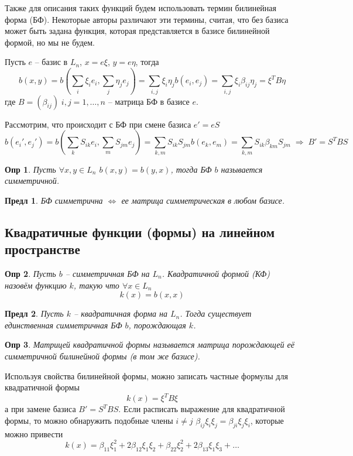 \documentclass[a4paper,12pt]{article}
\newtheorem*{definition}{Опр}
\newtheorem{propos}{Предл}[section]
\begin{document}
Также для описания таких функций будем использовать термин билинейная форма (БФ). Некоторые авторы различают эти термины, считая, что без базиса может быть задана функция, которая представляется в базисе билинейной формой, но мы не будем.

Пусть $e$ -- базис в $L_n$, $x = e\xi$, $y = e\eta$, тогда 
\[
	b(x,y) = b\left( \sum_{i} \xi_i e_i, \sum_{j} \eta_j e_j \right) = \sum_{i,j} \xi_i \eta_j b(e_i, e_j) = \sum_{i,j} \xi_i \beta_{ij} \eta_j  = \xi^T B \eta
\]
где $B = (\beta_{ij}) \; i,j = 1,\ldots, n$ -- матрица БФ в базисе $e$. 

Рассмотрим, что происходит с БФ при смене базиса $e' = eS$
\[
	b(e_i', e_j') = b\left( \sum_{k} S_{ik} e_i, \sum_{m} S_{jm} e_j \right) =  \sum_{k, m} S_{ik} S_{jm} b(e_k, e_m) = \sum_{k, m} S_{ik} \beta_{km} S_{jm} \; \Rightarrow \; B' = S^T B S
\]

\begin{definition}
	Пусть $\forall x,y \in L_n$ $b(x,y) = b(y,x)$, тогда БФ $b$ называется симметричной.
\end{definition}

\begin{propos}
	БФ симметрична $\Leftrightarrow$ ее матрица симметрическая в любом базисе.
\end{propos}

\subsection{Квадратичные функции (формы) на линейном пространстве}

\begin{definition}
	Пусть $b$ -- симметричная БФ на $L_n$. Квадратичной формой (КФ) назовём функцию $k$, такую что $\forall x \in L_n$ 
	\[
		k(x) = b(x,x)
	\]
\end{definition}

\begin{propos}
	Пусть $k$ -- квадратичная форма на $L_n$. Тогда существует единственная симметричная БФ $b$, порождающая $k$.
\end{propos}

\begin{definition}
	Матрицей квадратичной формы называется матрица порождающей её симметричной билинейной формы (в том же базисе).
\end{definition}

Используя свойства билинейной формы, можно записать частные формулы для квадратичной формы
\[
	k(x) = \xi^T B \xi
\]
а при замене базиса $B' = S^T B S$. Если расписать выражение для квадратичной формы, то можно обнаружить подобные члены $i \ne j$ $\beta_{ij} \xi_i \xi_j = \beta_{ji} \xi_j \xi_i$, которые можно привести
\[
	k(x) = \beta_{11} \xi_1^2 + 2 \beta_{12} \xi_1 \xi_2 + \beta_{22} \xi_2^2 + 2\beta_{13} \xi_1 \xi_3 + \ldots
\]
\end{document}
